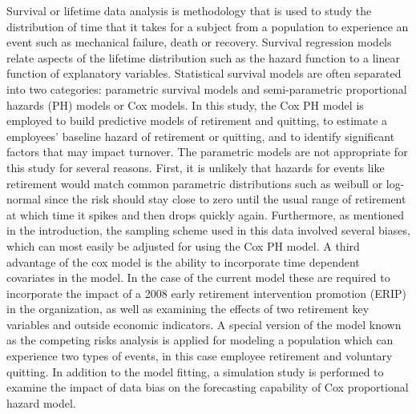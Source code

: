 \documentclass[12pt,letterpaper]{article}
\begin{document}

 Survival or lifetime data analysis is methodology that is used to study the distribution of time that it takes for a subject from a population to experience an event such as mechanical failure, death or recovery. Survival regression models relate aspects of the lifetime distribution such as the hazard function to a linear function of explanatory variables.  Statistical survival models are often separated into two categories: parametric survival models and semi-parametric proportional hazards (PH) models or Cox models. In this study, the Cox PH model is employed to build predictive models of retirement and quitting, to estimate a employees' baseline hazard of retirement or quitting, and to identify significant factors that may impact turnover. The parametric models are not appropriate for this study for several reasons. First, it is unlikely that hazards for events like retirement would match common parametric distributions such as weibull or log-normal since the risk should stay close to zero until the usual range of retirement at which time it spikes and then drops quickly again.  Furthermore, as mentioned in the introduction, the sampling scheme used in this data involved several biases, which can most easily be adjusted for using the Cox PH model. A third advantage of the cox model is the ability to incorporate time dependent covariates in the model. In the case of the current model these are required to incorporate the impact of a 2008 early retirement intervention promotion (ERIP) in the organization, as well as examining the effects of two retirement key variables and outside economic indicators. A special version of the model known as the competing risks analysis is applied for modeling a population which can experience two types of events, in this case employee retirement and voluntary quitting. In addition to the model fitting, a simulation study is performed to examine the impact of data bias on the forecasting capability of Cox proportional hazard model.
\end{document}

